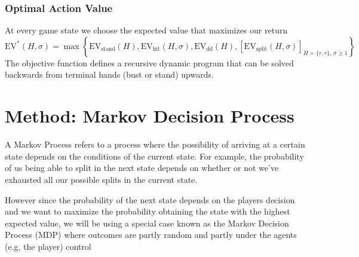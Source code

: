 \documentclass[12pt,a4paper]{cibb}
\begin{document}
\subsubsection*{Optimal Action Value}

At every game state we choose the expected value that maximizes our return
\begin{equation}
\mathrm{EV}^*(H, σ  ) =
\max \left\{
\mathrm{EV}_{\text{stand}}(H),
\mathrm{EV}_{\text{hit}}(H, σ  ),
\mathrm{EV}_{\text{dd}}(H),
\left[\mathrm{EV}_{\text{split}}(H, σ  )\right]_{H = \{r, r\},\, σ   \geq 1}
\right\}
\label{eq:OBJ_FUNCTION}
    \end{equation}
The objective function defines a recursive dynamic program that can be solved backwards from terminal hands (bust or stand) upwards. 

\section*{Method: Markov Decision Process }
A Markov Process refers to a process where the possibility of arriving at a certain state depends on the conditions of the current state. For example, the probability of us being able to split in the next state depends on whether or not we've exhausted all our possible splits in the current state.

However since the probability of the next state depends on the players decision and we want to maximize the probability obtaining the state with the highest expected value, we will be using a special case known as the Markov Decision Process (MDP) where outcomes are partly random and partly under the agents (e.g, the player) control
\end{document}
